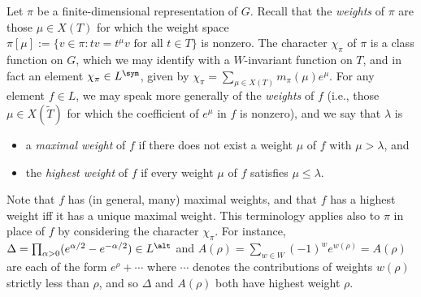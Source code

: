 \documentclass[reqno]{amsart} 
\begin{document}
Let $\pi$ be a finite-dimensional representation of $G$.  Recall that the \emph{weights} of $\pi$ are those $\mu \in X(T)$ for which the weight space $\pi[\mu] := \{v \in \pi : t v = t^{\mu} v \text{ for all } t \in T\}$ is nonzero.  The character $\chi_\pi$ of $\pi$ is a class function on $G$, which we may identify with a $W$-invariant function on $T$, and in fact an element $\chi_\pi \in L^{\sym}$, given by $\chi_\pi = \sum_{\mu \in X(T)} m_\pi(\mu) e^{\mu}$.  For any element $f \in L$, we may speak more generally of the \emph{weights} of $f$ (i.e., those $\mu \in X(\tilde{T})$ for which the coefficient of $e^{\mu}$ in $f$ is nonzero), and we say that $\lambda$ is
\begin{itemize}
\item a \emph{maximal weight} of $f$ if there does not exist a weight $\mu$ of $f$ with $\mu > \lambda$, and
\item the \emph{highest weight} of $f$ if every weight $\mu$ of $f$ satisfies $\mu \leq \lambda$.
\end{itemize}
Note that $f$ has (in general, many) maximal weights, and that $f$ has a highest weight iff it has a unique maximal weight.  This terminology applies also to $\pi$ in place of $f$ by considering the character $\chi_\pi$.  For instance, $\Delta = \prod_{\alpha > 0} (e^{\alpha/2} - e^{-\alpha/2})\in L^{\alt}$ and $A(\rho) = \sum_{w \in W} (-1)^w e^{w(\rho)} = A(\rho)$ are each of the form $e^{\rho} + \dotsb$ where $\dotsb$ denotes the contributions of weights $w(\rho)$ strictly less than $\rho$, and so $\Delta$ and $A(\rho)$ both have highest weight $\rho$.
\end{document}
